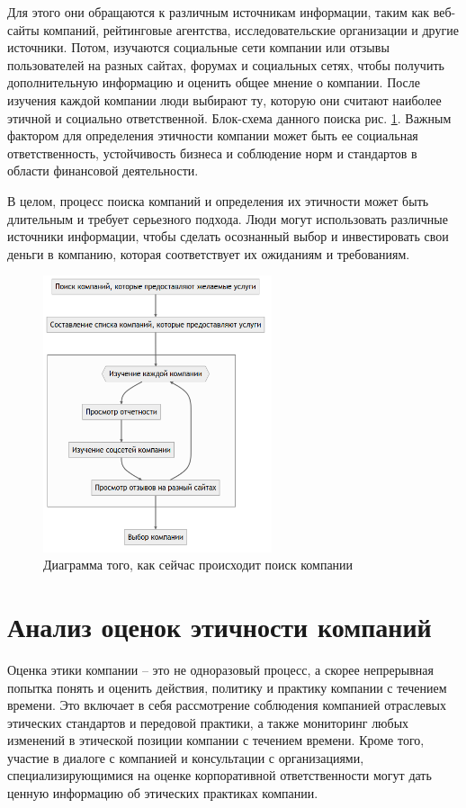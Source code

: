 \documentclass[PI, VKR]{HSEUniversity}
\begin{document}
Для этого они обращаются к различным источникам информации, таким как веб-сайты компаний, рейтинговые агентства, исследовательские организации и другие источники. Потом, изучаются социальные сети компании или отзывы пользователей на разных сайтах, форумах и социальных сетях, чтобы получить дополнительную информацию и оценить общее мнение о компании. После изучения каждой компании люди выбирают ту, которую они считают наиболее этичной и социально ответственной. Блок-схема данного поиска рис. \ref{fig:as_is}. Важным фактором для определения этичности компании может быть ее социальная ответственность, устойчивость бизнеса и соблюдение норм и стандартов в области финансовой деятельности.

В целом, процесс поиска компаний и определения их этичности может быть длительным и требует серьезного подхода. Люди могут использовать различные источники информации, чтобы сделать осознанный выбор и инвестировать свои деньги в компанию, которая соответствует их ожиданиям и требованиям.
\begin{figure}[h]
\centering
\includegraphics[width=0.6\textwidth]{img/mermaid/as_is.png}
\caption{\label{fig:as_is}Диаграмма того, как сейчас происходит поиск компании}
\end{figure}

\section{Анализ оценок этичности компаний}
\label{sec:org04e601a}
Оценка этики компании -- это не одноразовый процесс, а скорее непрерывная попытка понять и оценить действия, политику и практику компании с течением времени. Это включает в себя рассмотрение соблюдения компанией отраслевых этических стандартов и передовой практики, а также мониторинг любых изменений в этической позиции компании с течением времени. Кроме того, участие в диалоге с компанией и консультации с организациями, специализирующимися на оценке корпоративной ответственности могут дать ценную информацию об этических практиках компании.
\end{document}
